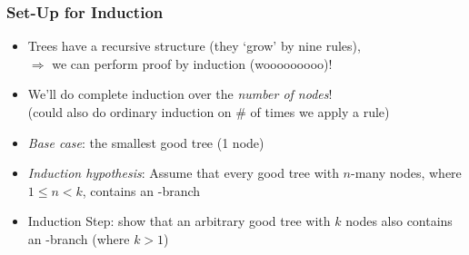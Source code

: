 \begin{frame}
\frametitle{Set-Up for Induction}

\begin{itemize}[<+->]

\item Trees have a recursive structure (they `grow' by nine rules), \\ $\Rightarrow$ we can perform proof by induction (wooooooooo)!

\item We'll do complete induction over the \textit{number of nodes}! \\ (could also do ordinary induction on \# of times we apply a rule) 


\item \emph{Base case}: the smallest good tree (1 node)

\item \emph{Induction hypothesis}: Assume that every good tree with $n$-many nodes, where $1 \leq n < k$, contains an -branch


\item Induction Step: show that an arbitrary good tree with $k$ nodes also contains an -branch (where $k > 1$)





\end{itemize}
\end{frame}

